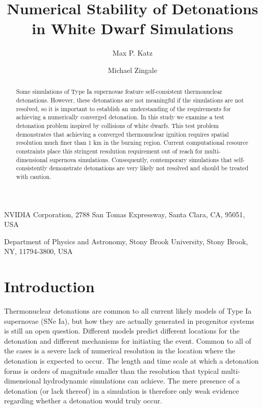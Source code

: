 \documentclass[twocolumn,numberedappendix,trackchanges]{../aastex62}
\begin{document}
\title{Numerical Stability of Detonations in White Dwarf Simulations}


\author{Max P. Katz}
\affiliation
{
  NVIDIA Corporation, 2788 San Tomas Expressway, Santa Clara, CA, 95051, USA
}

\author{Michael Zingale}
\affiliation
{
  Department of Physics and Astronomy, Stony Brook University, Stony Brook, NY, 11794-3800, USA
}



\begin{abstract}
Some simulations of Type Ia supernovae feature self-consistent thermonuclear
detonations. However, these detonations are not meaningful if the simulations
are not resolved, so it is important to establish an understanding of the
requirements for achieving a numerically converged detonation. In this
study we examine a test detonation problem inspired by collisions of white dwarfs.
This test problem demonstrates that achieving a converged thermonuclear ignition
requires spatial resolution much finer than 1 km in the burning region.
Current computational resource constraints place this stringent resolution
requirement out of reach for multi-dimensional supernova simulations.
Consequently, contemporary simulations that self-consistently demonstrate
detonations are very likely not resolved and should be treated with caution.
\end{abstract}

\section{Introduction}
\label{sec:introduction}

Thermonuclear detonations are common to all current likely models of Type Ia
supernovae (SNe Ia), but how they are actually generated in progenitor systems
is still an open question. Different models predict different locations for
the detonation and different mechanisms for initiating the event. Common to all
of the cases is a severe lack of numerical resolution in the location where the
detonation is expected to occur. The length and time scale at which a detonation
forms is orders of magnitude smaller than the resolution that typical multi-dimensional
hydrodynamic simulations can achieve. The mere presence of a detonation (or lack thereof)
in a simulation is therefore only weak evidence regarding whether a detonation would truly occur.
\end{document}
